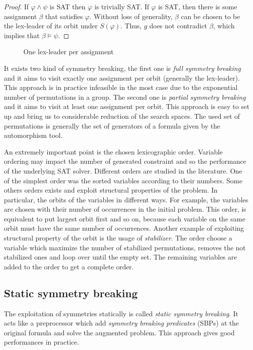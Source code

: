 \begin{proof}
	If $\varphi \wedge \psi$ is SAT then $\varphi$ is trivially SAT. If
	$\varphi$ is SAT, then there is some assignment $\beta$ that satisfies $\varphi$.
	Without loss of generality, $\beta$ can be chosen to be the lex-leader of its
	orbit under $S(\varphi)$. Thus, $g$ does not contradict $\beta$, which implies that
	$\beta \models \psi$.
\end{proof}

 
\begin{figure}
	\centering
	
	\caption{One lex-leader per assignment}
\end{figure}


It exists two kind of symmetry breaking, the first one is \emph{full symmetry breaking} and it 
aims to visit exactly one assignment per orbit (generally the lex-leader). This
approach is in practice infeasible in the most case due to the exponential number of permutations in a group.
The second one is \emph{partial symmetry breaking} and it aims to visit at least one assignment per orbit. This approach is easy to set up and bring us to considerable reduction of the search spaces. The used set
of permutations is generally the set of generators of a formula given by the automorphism tool.

An extremely important point is the chosen lexicographic order.
Variable ordering may impact the number of generated constraint and so the performance of
the underlying SAT solver. Different orders are studied in the literature. 
One of the simplest order was the sorted variables according to their numbers.
Some others orders exists and exploit structural properties of the 
problem. In particular, the orbits of the variables in different ways. For example, the variables are chosen 
with their number of occurrences in the initial problem. This order, is equivalent to put largest orbit first
and so on, because each variable on the same orbit must have the same number of occurrences.
Another example of exploiting structural property of the orbit is the usage of \emph{stabilizer}.
The order choose a variable which maximize the number of stabilized permutations, removes the not stabilized ones and loop over until the empty set. The remaining variables are added to the order to get a complete order.




\subsection{Static symmetry breaking}
The exploitation of symmetries statically is called \emph{static symmetry breaking}.
It acts like a preprocessor which add \emph{symmetry breaking predicates} (SBPs) at the 
original formula and solve the augmented problem. 
This approach gives good performances in practice.

